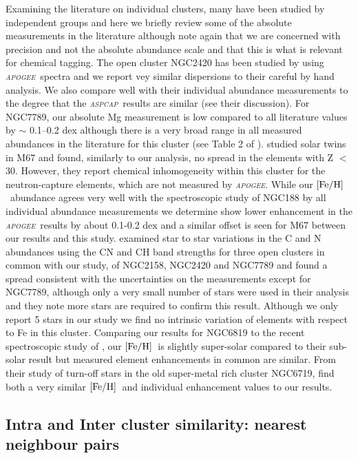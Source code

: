 \documentclass[14pt, preprint2]{aastex6}
\newcommand{\project}[1]{\textsl{#1}}
\newcommand{\apogee}{\project{\textsc{apogee}}}
\newcommand{\aspcap}{\project{\textsc{aspcap}}}
\newcommand{\feh}{\mbox{$\rm [Fe/H]$}}
\begin{document}
Examining the literature on individual clusters, many have been studied by independent groups and here we briefly review some of the absolute measurements in the literature although note again that we are concerned with precision and not the absolute abundance scale and that this is what is relevant for chemical tagging. The open cluster NGC2420 has been studied by \citet{Souto2016} using \apogee\ spectra and we report vey similar dispersions to their careful by hand analysis. We also compare well with their individual abundance measurements to the degree that the \aspcap\ results are similar (see their discussion). For NGC7789,  our absolute Mg measurement is low compared to all literature values by $\sim$ 0.1--0.2 dex although there is a very broad range in all measured abundances in the literature for this cluster (see Table 2 of \citet{Overbeek2015}). \citet{Lui2016} studied solar twins in M67 and found, similarly to our analysis, no spread in the elements with Z $<$ 30. However, they report chemical inhomogeneity within this cluster for the neutron-capture elements, which are not measured by \apogee. While our \feh\ abundance agrees very well with the spectroscopic study of NGC188 by \citet{Friel2010} all individual abundance measurements we determine show lower enhancement in the \apogee\ results by about 0.1-0.2 dex and a similar offset is seen for M67 between our results and this study. \citet{Car2013} examined star to star variations in the C and N abundances using the CN and CH band strengths for three open clusters in common with our study, of NGC2158, NGC2420 and NGC7789 and found a spread consistent with the uncertainties on the measurements except for NGC7789, although only a very small number of stars were used in their analysis and they note more stars are required to confirm this result. Although we only report 5 stars in our study we find no intrinsic variation of elements with respect to Fe in this cluster.  Comparing our results for NGC6819 to the recent spectroscopic study of \citet{LB2015}, our \feh\ is slightly super-solar compared to their sub-solar result but measured element enhancements in common are similar. From their study of turn-off stars in the old super-metal rich cluster NGC6719, \citet{Bo2015} find both a  very similar \feh\ and individual enhancement values to our results. 


\subsection{Intra and Inter cluster similarity: nearest neighbour pairs}
\end{document}
